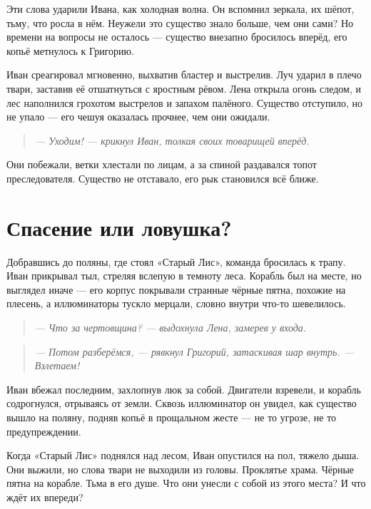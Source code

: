 \documentclass[12pt,a4paper]{book}
\newenvironment{dialogue}{\begin{quote}\itshape}{\end{quote}}
\begin{document}
Эти слова ударили Ивана, как холодная волна. Он вспомнил зеркала, их шёпот, тьму, что росла в нём. Неужели это существо знало больше, чем они сами? Но времени на вопросы не осталось --- существо внезапно бросилось вперёд, его копьё метнулось к Григорию.

Иван среагировал мгновенно, выхватив бластер и выстрелив. Луч ударил в плечо твари, заставив её отшатнуться с яростным рёвом. Лена открыла огонь следом, и лес наполнился грохотом выстрелов и запахом палёного. Существо отступило, но не упало --- его чешуя оказалась прочнее, чем они ожидали.

\begin{dialogue}
--- Уходим! --- крикнул Иван, толкая своих товарищей вперёд.
\end{dialogue}

Они побежали, ветки хлестали по лицам, а за спиной раздавался топот преследователя. Существо не отставало, его рык становился всё ближе.

\section*{Спасение или ловушка?}

Добравшись до поляны, где стоял «Старый Лис», команда бросилась к трапу. Иван прикрывал тыл, стреляя вслепую в темноту леса. Корабль был на месте, но выглядел иначе --- его корпус покрывали странные чёрные пятна, похожие на плесень, а иллюминаторы тускло мерцали, словно внутри что-то шевелилось.

\begin{dialogue}
--- Что за чертовщина? --- выдохнула Лена, замерев у входа.
\end{dialogue}

\begin{dialogue}
--- Потом разберёмся, --- рявкнул Григорий, затаскивая шар внутрь. --- Взлетаем!
\end{dialogue}

Иван вбежал последним, захлопнув люк за собой. Двигатели взревели, и корабль содрогнулся, отрываясь от земли. Сквозь иллюминатор он увидел, как существо вышло на поляну, подняв копьё в прощальном жесте --- не то угрозе, не то предупреждении.

Когда «Старый Лис» поднялся над лесом, Иван опустился на пол, тяжело дыша. Они выжили, но слова твари не выходили из головы. Проклятье храма. Чёрные пятна на корабле. Тьма в его душе. Что они унесли с собой из этого места? И что ждёт их впереди?
\end{document}
